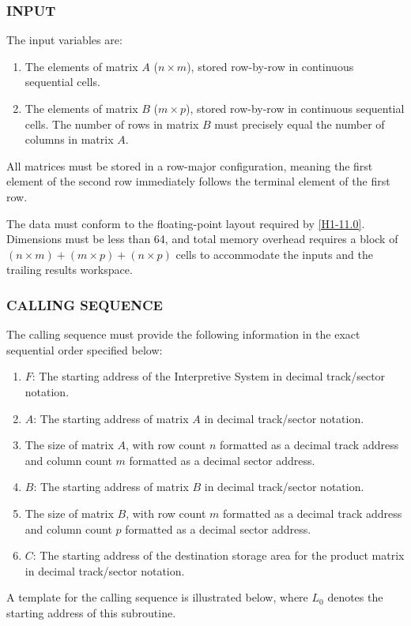 \documentclass{article}
\begin{document}
\subsubsection*{INPUT}
The input variables are:
\begin{enumerate}[label=\arabic*., leftmargin=1.5em, itemsep=2pt]
    \item The elements of matrix $A$ ($n \times m$), stored row-by-row in continuous sequential cells.
    \item The elements of matrix $B$ ($m \times p$), stored row-by-row in continuous sequential cells. The number of rows in matrix $B$ must precisely equal the number of columns in matrix $A$.
\end{enumerate}
\noindent
All matrices must be stored in a row-major configuration, meaning the first element of the second row immediately follows the terminal element of the first row.

The data must conform to the floating-point layout required by \ref{H1-11.0}. Dimensions must be less than 64, and total memory overhead requires a block of $(n \times m) + (m \times p) + (n \times p)$ cells to accommodate the inputs and the trailing results workspace.

\subsubsection*{CALLING SEQUENCE}
The calling sequence must provide the following information in the exact sequential order specified below:
\begin{enumerate}[label=\arabic*., leftmargin=1.5em, itemsep=2pt]
    \item $F$: The starting address of the Interpretive System in decimal track/sector notation.
    \item $A$: The starting address of matrix $A$ in decimal track/sector notation.
    \item The size of matrix $A$, with row count $n$ formatted as a decimal track address and column count $m$ formatted as a decimal sector address.
    \item $B$: The starting address of matrix $B$ in decimal track/sector notation.
    \item The size of matrix $B$, with row count $m$ formatted as a decimal track address and column count $p$ formatted as a decimal sector address.
    \item $C$: The starting address of the destination storage area for the product matrix in decimal track/sector notation.
\end{enumerate}
A template for the calling sequence is illustrated below, where \texttt{$L_0$} denotes the starting address of this subroutine.
\end{document}
